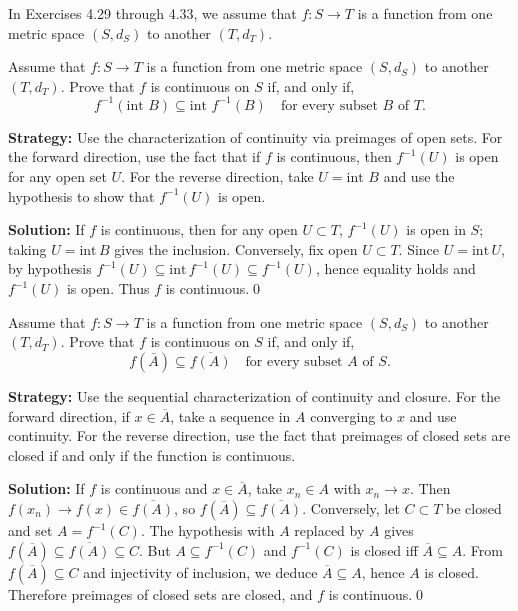 In Exercises 4.29 through 4.33, we assume that $f:S\to T$ is a function from one metric space $(S,d_S)$ to another $(T,d_T)$.



\begin{problembox}
Assume that $f : S \rightarrow T$ is a function from one metric space $(S, d_S)$ to another $(T, d_T)$. Prove that $f$ is continuous on $S$ if, and only if,
\[ f^{-1}(\text{int } B) \subseteq \text{int } f^{-1}(B) \quad \text{for every subset } B \text{ of } T. \]
\end{problembox}

\noindent\textbf{Strategy:} Use the characterization of continuity via preimages of open sets. For the forward direction, use the fact that if $f$ is continuous, then $f^{-1}(U)$ is open for any open set $U$. For the reverse direction, take $U = \text{int } B$ and use the hypothesis to show that $f^{-1}(U)$ is open.

\bigskip\noindent\textbf{Solution:}
If $f$ is continuous, then for any open $U\subset T$, $f^{-1}(U)$ is open in $S$; taking $U=\mathrm{int}\,B$ gives the inclusion. Conversely, fix open $U\subset T$. Since $U=\mathrm{int}\,U$, by hypothesis $f^{-1}(U)\subseteq\mathrm{int}\,f^{-1}(U)\subseteq f^{-1}(U)$, hence equality holds and $f^{-1}(U)$ is open. Thus $f$ is continuous.\qed



\begin{problembox}
Assume that $f : S \rightarrow T$ is a function from one metric space $(S, d_S)$ to another $(T, d_T)$. Prove that $f$ is continuous on $S$ if, and only if,
\[ f(\bar{A}) \subseteq \overline{f(A)} \quad \text{for every subset } A \text{ of } S. \]
\end{problembox}

\noindent\textbf{Strategy:} Use the sequential characterization of continuity and closure. For the forward direction, if $x \in \overline{A}$, take a sequence in $A$ converging to $x$ and use continuity. For the reverse direction, use the fact that preimages of closed sets are closed if and only if the function is continuous.

\bigskip\noindent\textbf{Solution:}
If $f$ is continuous and $x\in\overline{A}$, take $x_n\in A$ with $x_n\to x$. Then $f(x_n)\to f(x)\in\overline{f(A)}$, so $f(\overline{A})\subseteq\overline{f(A)}$. Conversely, let $C\subset T$ be closed and set $A=f^{-1}(C)$. The hypothesis with $A$ replaced by $A$ gives $f(\overline{A})\subseteq\overline{f(A)}\subseteq C$. But $A\subseteq f^{-1}(C)$ and $f^{-1}(C)$ is closed iff $\overline{A}\subseteq A$. From $f(\overline{A})\subseteq C$ and injectivity of inclusion, we deduce $\overline{A}\subseteq A$, hence $A$ is closed. Therefore preimages of closed sets are closed, and $f$ is continuous.\qed



